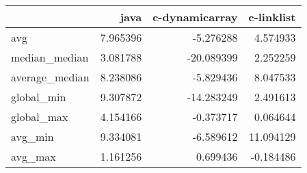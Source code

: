 \begin{tabular}{lrrr}
\toprule
{} &      java &  c-dynamicarray &  c-linklist \\
\midrule
avg            &  7.965396 &       -5.276288 &    4.574933 \\
median\_median  &  3.081788 &      -20.089399 &    2.252259 \\
average\_median &  8.238086 &       -5.829436 &    8.047533 \\
global\_min     &  9.307872 &      -14.283249 &    2.491613 \\
global\_max     &  4.154166 &       -0.373717 &    0.064644 \\
avg\_min        &  9.334081 &       -6.589612 &   11.094129 \\
avg\_max        &  1.161256 &        0.699436 &   -0.184486 \\
\bottomrule
\end{tabular}
